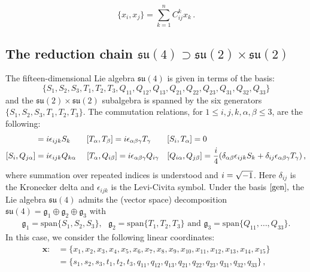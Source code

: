 \documentclass[10pt,a4paper]{amsart}
\begin{document}
\begin{equation}
	\{x_i,x_j\}= \sum_{k=1}^nC_{ij}^k x_k  \, .
	\label{xcoord}
\end{equation} 

\subsection{The reduction chain $\mathfrak{su}(4) \supset \mathfrak{su}(2) \times \mathfrak{su}(2)$}
\label{subsec3.1}
The fifteen-dimensional Lie algebra $\mathfrak{su}(4)$ is given in terms of the basis: 
\begin{equation}
\{S_1, S_2, S_3, T_1, T_2, T_3, Q_{11}, Q_{12}, Q_{13}, Q_{21}, Q_{22}, Q_{23}, Q_{31}, Q_{32}, Q_{33}\} 
\label{gen}
\end{equation}
and the $\mathfrak{su}(2) \times \mathfrak{su}(2)$ subalgebra is spanned by the six generators $\{S_1, S_2, S_3, T_1, T_2, T_3\}$. The commutation relations, for $1 \leq i,j,k,\alpha,\beta \leq 3$, are the following:
\begin{align}
[S_i, S_j]&={\rm i} \epsilon_{ijk}S_k \qquad [T_\alpha, T_\beta]={\rm i} \epsilon_{\alpha \beta \gamma}T_\gamma \qquad [S_i, T_\alpha]=0 \label{a} \\
[S_i, Q_{j\alpha}]&={\rm i} \epsilon_{ijk} Q_{k \alpha} \quad \,\, [T_\alpha, Q_{i\beta}]={\rm i} \epsilon_{\alpha \beta \gamma} Q_{i \gamma} \quad [Q_{i \alpha}, Q_{j \beta}]=\frac{{\rm i}}{4}(\delta_{\alpha \beta} \epsilon_{ijk}S_k+\delta_{ij}\epsilon_{\alpha \beta \gamma}T_\gamma) \, , \label{b}
\end{align}
where summation over repeated indices is understood and $\rm i = \sqrt{-1}$. Here $\delta_{ij}$ is the Kronecker delta and $\epsilon_{ijk}$ is the Levi-Civita symbol. Under the basis $\eqref{gen},$ the Lie algebra $\mathfrak{su}(4)$ admits the (vector space) decomposition $ \mathfrak{su}(4) = \mathfrak{g}_1 \oplus \mathfrak{g}_2 \oplus \mathfrak{g}_3$ with 
\begin{align*}
   \mathfrak{g}_1 = \mathrm{span} \{S_1,S_2,S_3\} , \text{ } \mathfrak{g}_2 = \mathrm{span} \{T_1,T_2,T_3\} \text{ and } \mathfrak{g}_3 = \mathrm{span} \{Q_{11},\ldots,Q_{33}\}.
\end{align*} In this case, we consider the following linear coordinates: 
\begin{align}
\boldsymbol{x}:&=\{x_1, x_2, x_3, x_4, x_5, x_6,x_7,x_8,x_9,x_{10},x_{11},x_{12}, x_{13}, x_{14}, x_{15}\} \nonumber \\ &=\{s_1,s_2,s_3,t_1,t_2,t_3,q_{11},q_{12},q_{13},q_{21},q_{22},q_{23},q_{31},q_{32},q_{33}\} \, ,
\label{lincoord}
\end{align}
\end{document}
